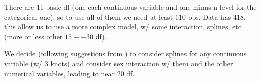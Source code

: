 \documentclass[]{book}
\newenvironment{Shaded}{\begin{snugshade}}{\end{snugshade}}
\newcommand{\KeywordTok}[1]{\textcolor[rgb]{0.13,0.29,0.53}{\textbf{{#1}}}}
\newcommand{\DataTypeTok}[1]{\textcolor[rgb]{0.13,0.29,0.53}{{#1}}}
\newcommand{\DecValTok}[1]{\textcolor[rgb]{0.00,0.00,0.81}{{#1}}}
\newcommand{\StringTok}[1]{\textcolor[rgb]{0.31,0.60,0.02}{{#1}}}
\newcommand{\CommentTok}[1]{\textcolor[rgb]{0.56,0.35,0.01}{\textit{{#1}}}}
\newcommand{\NormalTok}[1]{{#1}}
\theoremstyle{definition}
\theoremstyle{definition}
\theoremstyle{definition}
\theoremstyle{remark}
\begin{document}
There are 11 basic df (one each continuous variable and
one-minus-n-level for the categorical one), so to use all of them we
need at least \(110\) obs. Data has \(418\), this allow us to use a more
complex model, w/ some interaction, splines, etc (more or less other
\(15 -- 30\) df).

We decide (following suggestions from \citet{harrell2015regression}) to
consider splines for any continuous variable (w/ 3 knots) and consider
sex interaction w/ them and the other numerical variables, leading to
near \(20\) df.

\begin{Shaded}
\end{Shaded}
\end{document}
